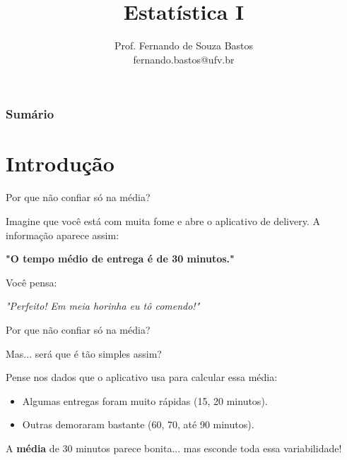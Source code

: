 \documentclass[14pt,aspectratio=1610]{beamer}
\title{Estatística I}
\author{Prof. Fernando de Souza Bastos \texorpdfstring{\\ fernando.bastos@ufv.br}{}}
\institute{Departamento de Estatística \texorpdfstring{\\ Universidade Federal de Viçosa}{}\texorpdfstring{\\ Campus UFV - Viçosa}{}}
\date{}
\begin{document}
	
	\frame{\titlepage}
	
	\begin{frame}{}
		\frametitle{\bf Sumário}
		\tableofcontents
	\end{frame}
	
\section{Introdução}

\begin{frame}{Por que não confiar só na média?}
	
	\begin{block}{}
		\justifying
		
		Imagine que você está com muita fome e abre o aplicativo de delivery. A informação aparece assim:
		
		\begin{center}
			\textbf{"O tempo médio de entrega é de 30 minutos."}
		\end{center}
		
		Você pensa:
		
		\textit{"Perfeito! Em meia horinha eu tô comendo!"}
		
	\end{block}
	
\end{frame}

\begin{frame}{Por que não confiar só na média?}
	
	\begin{block}{}
		\justifying
		
		Mas... será que é tão simples assim?
		
		Pense nos dados que o aplicativo usa para calcular essa média:
		
		\begin{itemize}
			\item Algumas entregas foram muito rápidas (15, 20 minutos).
			\item Outras demoraram bastante (60, 70, até 90 minutos).
		\end{itemize}
		
		A \textbf{média} de 30 minutos parece bonita... mas esconde toda essa variabilidade!
		
	\end{block}
	
\end{frame}
\end{document}
